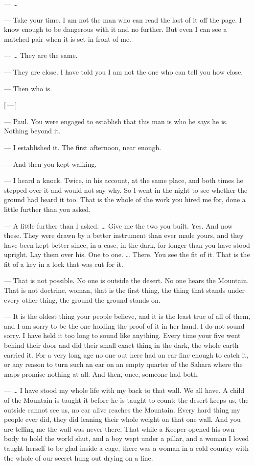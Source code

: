 \begin{room}
--- \ldots{}

--- Take your time. I am not the man who can read the last of it off the page. I know enough to be dangerous with it and no further. But even I can see a matched pair when it is set in front of me.

--- \ldots{} They are the same.

--- They are close. I have told you I am not the one who can tell you how close.

--- Then who is.

\centerline{[\,---\,]}

--- Paul. You were engaged to establish that this man is who he says he is. Nothing beyond it.

--- I established it. The first afternoon, near enough.

--- And then you kept walking.

--- I heard a knock. Twice, in his account, at the same place, and both times he stepped over it and would not say why. So I went in the night to see whether the ground had heard it too. That is the whole of the work you hired me for, done a little further than you asked.

--- A little further than I asked. \ldots{} Give me the two you built. Yes. And now these. They were drawn by a better instrument than ever made yours, and they have been kept better since, in a case, in the dark, for longer than you have stood upright. Lay them over his. One to one. \ldots{} There. You see the fit of it. That is the fit of a key in a lock that was cut for it.

--- That is not possible. No one is outside the desert. No one hears the Mountain. That is not doctrine, woman, that is the first thing, the thing that stands under every other thing, the ground the ground stands on.

--- It is the oldest thing your people believe, and it is the least true of all of them, and I am sorry to be the one holding the proof of it in her hand. I do not sound sorry. I have held it too long to sound like anything. Every time your five went behind their door and did their small exact thing in the dark, the whole earth carried it. For a very long age no one out here had an ear fine enough to catch it, or any reason to turn such an ear on an empty quarter of the Sahara where the maps promise nothing at all. And then, once, someone had both.

--- \ldots{} I have stood my whole life with my back to that wall. We all have. A child of the Mountain is taught it before he is taught to count: the desert keeps us, the outside cannot see us, no ear alive reaches the Mountain. Every hard thing my people ever did, they did leaning their whole weight on that one wall. And you are telling me the wall was never there. That while a Keeper opened his own body to hold the world shut, and a boy wept under a pillar, and a woman I loved taught herself to be glad inside a cage, there was a woman in a cold country with the whole of our secret hung out drying on a line.


\end{room}
